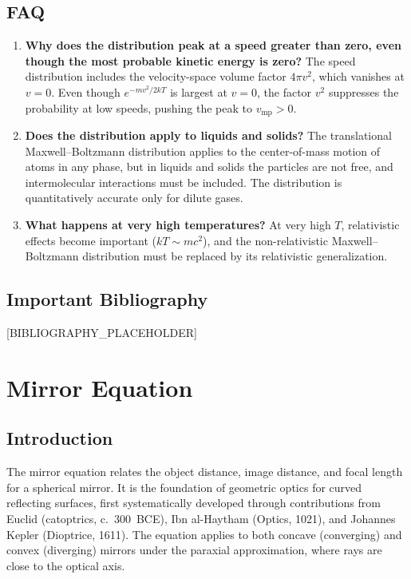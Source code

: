 \documentclass[11pt,openright]{book}
\begin{document}
\section*{FAQ}

\begin{enumerate}
\item \textbf{Why does the distribution peak at a speed greater than zero, even though the most probable kinetic energy is zero?}
The speed distribution includes the velocity-space volume factor $4\pi v^{2}$, which vanishes at $v = 0$. Even though $e^{-mv^{2}/2kT}$ is largest at $v = 0$, the factor $v^{2}$ suppresses the probability at low speeds, pushing the peak to $v_{\text{mp}} > 0$.

\item \textbf{Does the distribution apply to liquids and solids?}
The translational Maxwell--Boltzmann distribution applies to the center-of-mass motion of atoms in any phase, but in liquids and solids the particles are not free, and intermolecular interactions must be included. The distribution is quantitatively accurate only for dilute gases.

\item \textbf{What happens at very high temperatures?}
At very high $T$, relativistic effects become important ($kT \sim mc^{2}$), and the non-relativistic Maxwell--Boltzmann distribution must be replaced by its relativistic generalization.
\end{enumerate}
\section*{Important Bibliography}

[BIBLIOGRAPHY_PLACEHOLDER]


\chapter{Mirror Equation}

\section*{Introduction}

The mirror equation relates the object distance, image distance, and focal length for a spherical mirror. It is the foundation of geometric optics for curved reflecting surfaces, first systematically developed through contributions from Euclid (catoptrics, c.~300~BCE), Ibn al-Haytham (Optics, 1021), and Johannes Kepler (Dioptrice, 1611). The equation applies to both concave (converging) and convex (diverging) mirrors under the paraxial approximation, where rays are close to the optical axis.
\end{document}
